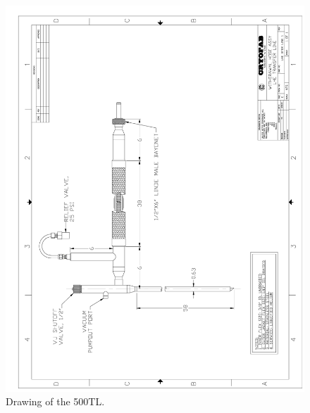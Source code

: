 \begin{appendices}
\begin{figure}[tbp!]
 \centering
 \includegraphics[width=\textwidth]{./img/500TL-drawing.png}
 \caption{Drawing of the 500TL.}
 \label{fig:500TL-drawing}
\end{figure}


\end{appendices}
